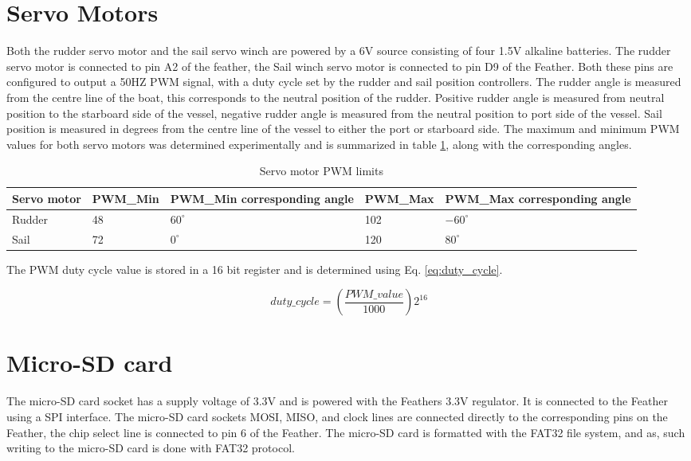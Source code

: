 \section{Servo Motors}
Both the rudder servo motor and the sail servo winch are powered by a 6V source consisting of four 1.5V alkaline batteries. The rudder servo motor is connected to pin
A2 of the feather, the Sail winch servo motor is connected to pin D9 of the Feather. Both these pins are configured to output a 50HZ PWM signal, with a duty cycle set
by the rudder and sail position controllers. The rudder angle is measured from the centre line of the boat, this corresponds to the neutral position of the rudder. Positive 
rudder angle is measured from neutral position to the starboard side of the vessel, negative rudder angle is measured from the neutral position to port side of the vessel. 
Sail position is measured in degrees from the centre line of the vessel to either the port or starboard side. The maximum and minimum PWM values for both servo motors was 
determined experimentally and is summarized in table \ref{table:pwm}, along with the corresponding angles. 

\begin{table}[!h]
    \centering
    \caption{Servo motor PWM limits}
    \label{table:pwm}
    \begin{tabularx}{\columnwidth}{ | X | X | X | X | X | }
        
        \hline
        Servo motor & PWM\_Min & PWM\_Min corresponding angle & PWM\_Max & PWM\_Max corresponding angle \\
        \hline
        Rudder & 48 & $60^{\circ}$ & 102 & $-60^{\circ}$ \\
        \hline
        Sail & 72 &  $0^{\circ}$ & 120 & $80^{\circ}$\\
        \hline
    \end{tabularx}
\end{table}

The PWM duty cycle value is stored in a 16 bit register and is determined using Eq. \ref{eq:duty_cycle}.

\begin{equation}
    \label{eq:duty_cycle}
    duty\_cycle = (\frac{PWM\_value}{1000}) 2^{16}
\end{equation}

\section{Micro-SD card}
The micro-SD card socket has a supply voltage of 3.3V and is powered with the Feathers 3.3V regulator. It is connected to the Feather using a SPI interface. The micro-SD card sockets MOSI, MISO,
 and clock lines are connected directly to the corresponding pins on the Feather, the chip select line is connected to pin 6 of the Feather. The micro-SD card is formatted with the FAT32 file 
 system, and as, such writing to the micro-SD card is done with FAT32 protocol.


